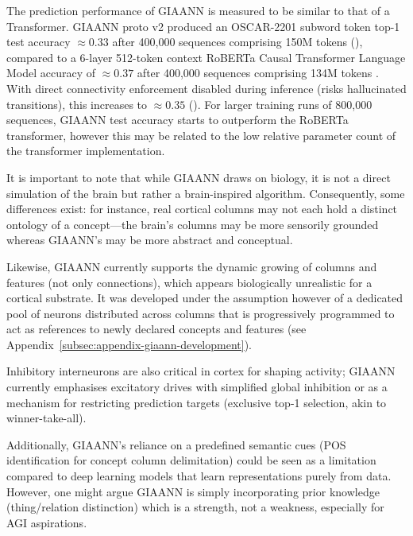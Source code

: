 The prediction performance of GIAANN is measured to be similar to that of a Transformer. GIAANN proto v2 produced an OSCAR-2201 subword token top-1 test accuracy $\approx 0.33$ after 400,000 sequences comprising 150M tokens (), compared to a 6-layer 512-token context RoBERTa Causal Transformer Language Model \citep{liu2019roberta} accuracy of $\approx 0.37$ after 400,000 sequences comprising 134M tokens \citep{bairesearch2022TSBNLP}. With direct connectivity enforcement disabled during inference (risks hallucinated transitions), this increases to  $\approx 0.35$ (). For larger training runs of 800,000 sequences, GIAANN test accuracy starts to outperform the RoBERTa transformer, however this may be related to the low relative parameter count of the transformer implementation.

It is important to note that while GIAANN draws on biology, it is not a direct simulation of the brain but rather a brain-inspired algorithm.
Consequently, some differences exist: for instance, real cortical columns may not each hold a distinct ontology of a concept---the brain’s columns may be more sensorily grounded whereas GIAANN’s may be more abstract and conceptual. 

Likewise, GIAANN currently supports the dynamic growing of columns and features (not only connections), which appears biologically unrealistic for a cortical substrate. It was developed under the assumption however of a dedicated pool of neurons distributed across columns that is progressively programmed to act as references to newly declared concepts and features (see Appendix~\ref{subsec:appendix-giaann-development}).

Inhibitory interneurons are also critical in cortex for shaping activity; GIAANN currently emphasises excitatory drives with simplified global inhibition or as a mechanism for restricting prediction targets (exclusive top-1 selection, akin to winner-take-all).

Additionally, GIAANN’s reliance on a predefined semantic cues (POS identification for concept column delimitation) could be seen as a limitation compared to deep learning models that learn representations purely from data.
However, one might argue GIAANN is simply incorporating prior knowledge (thing/relation distinction) which is a strength, not a weakness, especially for AGI aspirations.

